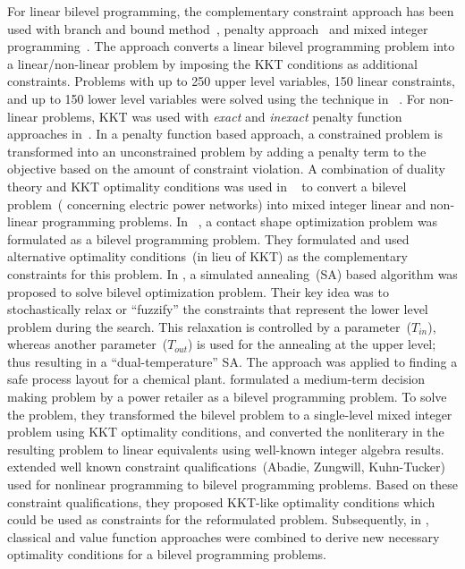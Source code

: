 For linear bilevel programming, the complementary constraint approach has been used with branch and bound method~\cite{hansen1992new}, penalty approach~\cite{lv2007penalty} and mixed integer programming~\cite{saharidis2009resolution}. The approach converts a linear bilevel programming problem into a linear/non-linear problem by imposing the KKT conditions as additional constraints. Problems with up to 250 upper level variables, 150 linear constraints, and up to 150 lower level variables were solved using the technique in ~\cite{hansen1992new}. For non-linear problems, KKT was used with \emph{exact} and \emph{inexact} penalty function approaches in~\cite{marcotte1996exact}. In a penalty function based approach, a constrained problem is transformed into an unconstrained problem by adding a penalty term to the objective based on the amount of constraint violation. A combination of duality theory and KKT optimality conditions was used in ~\cite{jenabi2013bi} to convert a bilevel problem~( concerning electric power networks) into mixed integer linear and non-linear programming problems. In ~\cite{herskovits2000contact}, a contact shape optimization problem was formulated as a bilevel programming problem. They formulated and used alternative optimality conditions~(in lieu of KKT) as the complementary constraints for this problem. In \cite{sahin1998dual}, a simulated annealing~(SA) based algorithm was proposed to solve bilevel optimization problem. Their key idea was to stochastically relax or ``fuzzify'' the constraints that represent the lower level problem during the search. This relaxation is controlled by a parameter~($T_{in}$), whereas another parameter~($T_{out}$) is used for the annealing at the upper level; thus resulting in a ``dual-temperature'' SA. The approach was applied to finding a safe process layout for a chemical plant. \cite{carrion2009bilevel} formulated a medium-term decision making problem by a power retailer as a bilevel programming problem. To solve the problem, they transformed the bilevel problem to a single-level mixed integer problem using KKT optimality conditions, and converted the nonliterary in the resulting problem to linear equivalents using well-known integer algebra results. \cite{ye2006constraint} extended well known constraint qualifications~(Abadie, Zungwill, Kuhn-Tucker)  used for nonlinear programming to bilevel programming problems. Based on these constraint qualifications, they proposed KKT-like optimality conditions which could be used as constraints for the reformulated problem. Subsequently, in \cite{ye2010new}, classical and value function approaches were combined to derive new necessary optimality conditions for a bilevel programming problems. 



